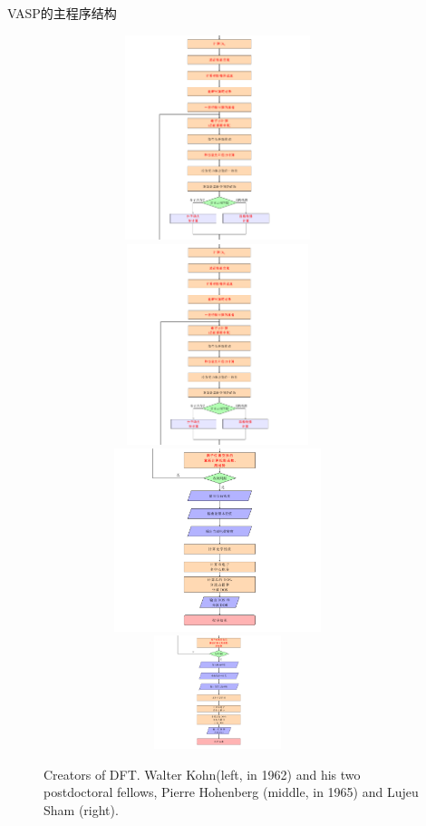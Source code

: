 \begin{frame}[allowframebreaks]{\textrm{VASP}的主程序结构}
\begin{figure}[h!]
\includegraphics[height=2.35in,width=4.0in,viewport=0 350 562 680,clip]{Figures/VASP_main_Flow-3.png}
\includegraphics[height=2.30in,width=4.0in,viewport=0 0 562 350,clip]{Figures/VASP_main_Flow-3.png}
\includegraphics[height=2.10in,width=4.0in,viewport=0 215 562 530,clip]{Figures/VASP_main_Flow-4.png}
\includegraphics[height=1.30in,width=4.0in,viewport=0 0 562 215,clip]{Figures/VASP_main_Flow-4.png}
\caption{\tiny \textrm{Creators of DFT. Walter Kohn(left, in 1962) and his two postdoctoral fellows, Pierre Hohenberg (middle, in 1965) and Lujeu Sham (right).}}%
\label{FLOW_of_VASP}
\end{figure}
\end{frame}
